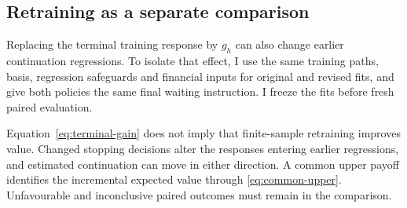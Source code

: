 \subsection{Retraining as a separate comparison}

Replacing the terminal training response by $g_h$ can also change earlier continuation regressions. To isolate that effect, I use the same training paths, basis, regression safeguards and financial inputs for original and revised fits, and give both policies the same final waiting instruction. I freeze the fits before fresh paired evaluation.

Equation~\eqref{eq:terminal-gain} does not imply that finite-sample retraining improves value. Changed stopping decisions alter the responses entering earlier regressions, and estimated continuation can move in either direction. A common upper payoff identifies the incremental expected value through \eqref{eq:common-upper}. Unfavourable and inconclusive paired outcomes must remain in the comparison.
